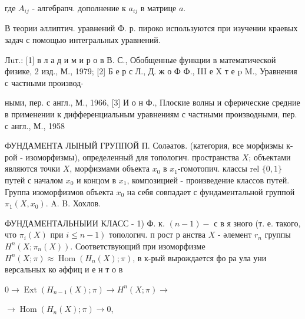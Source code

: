 \documentclass[10pt]{article}
\begin{document}
где $A_{i j}$ - алгебрапч. дополнение к $a_{i j}$ в матрице $a$.



В теории әллиптич. уравнений Ф. р. пироко используются при изучении краевых задач с помощью интегральных уравнений.



Лuт.: [1] в л а д и м и р о в В. С., Обобщенные функции в математической физике, 2 изд., М., 1979; [2] Б е р с Л., Д. ж о Ф Ф., III е X т е p M., Уравнения с частными производ-

ными, пер. с англ., М., 1966, [3] И о н Ф., Плоские волны и сферические средние в применении к дифференциальным уравнениям с частными производными, пер. с англ., М., 1958



ФУНДАМЕНТА ЛЫНЫЙ ГРУППОЙ П. Соләатов. (категория, все морфизмы к-рой - изоморфизмы), определенный для топологич. пространства $X$; объектами являются точки $X$, морфизмами объекта $x_{0}$ в $x_{1}$-гомотопич. классы rel $\{0,1\}$ путей с началом $x_{0}$ и концом в $x_{1}$, композицией - произведение классов путей. Группа изоморфизмов объекта $x_{0}$ на себя совпадает с фундаментальной группой $\pi_{1}\left(X, x_{0}\right)$. A. B. Хохлов.



ФУНДАМЕНТАЛЬНЫИИ КЛАСС - 1) Ф. к. $(n-1)-$ с в я зного (т. е. такого, что $\pi_{i}(X)$ при $\left.i \leqslant n-1\right)$ топологич. п рост р анства $X$ - әлемент $r_{n}$ группы $H^{n}\left(X ; \pi_{n}(X)\right)$. Соответствующий при изоморфизме $H^{n}(X ; \pi) \stackrel{ }{\approx} \operatorname{Hom}\left(H_{n}(X) ; \pi\right)$, в к-рый вырождается фо ра ула уни версальных ко әффиц и е н т о в



$0 \longrightarrow \operatorname{Ext}\left(H_{n-1}(X) ; \pi\right) \rightarrow H^{n}(X ; \pi) \longrightarrow$



$\longrightarrow \operatorname{Hom}\left(H_{n}(X) ; \pi\right) \longrightarrow 0$,
\end{document}
